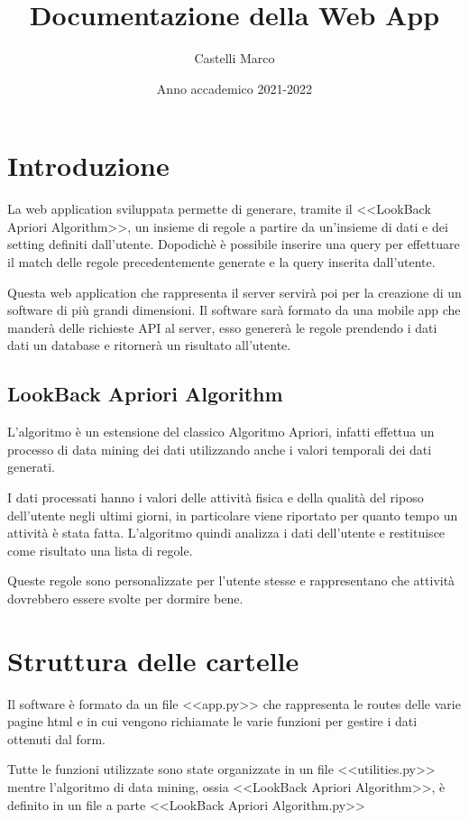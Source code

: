 \documentclass{article}
\title{Documentazione della Web App}
\author{Castelli Marco}
\date{Anno accademico 2021-2022}
\begin{document}
\maketitle
\newpage


\tableofcontents

\newpage

\section{Introduzione}

La web application sviluppata permette di generare, tramite il <<LookBack Apriori Algorithm>>, un insieme di regole a partire da un'insieme di dati e dei setting definiti dall'utente. Dopodichè è possibile inserire una query per effettuare il match delle regole precedentemente generate e la query inserita dall'utente.

Questa web application che rappresenta il server servirà poi per la creazione di un software di più grandi dimensioni. Il software sarà formato da una mobile app  che manderà delle richieste API al server, esso genererà le regole prendendo i dati dati un database e ritornerà un risultato all'utente.

\subsection{LookBack Apriori Algorithm}
L'algoritmo è un estensione del classico Algoritmo Apriori, infatti effettua un processo di data mining dei dati utilizzando anche i valori temporali dei dati generati.

 I dati processati hanno i valori delle attività fisica e della qualità del riposo dell'utente negli ultimi giorni, in particolare viene riportato per quanto tempo un attività è stata fatta. L'algoritmo quindi analizza i dati dell'utente e restituisce come risultato una lista di regole. 

Queste regole sono personalizzate per l'utente stesse e  rappresentano che attività dovrebbero essere svolte per dormire bene.

\section{Struttura delle cartelle}
Il software è formato da un file <<app.py>> che rappresenta le routes delle varie pagine html e in cui vengono richiamate le varie funzioni per gestire i dati ottenuti dal form.

Tutte le funzioni utilizzate sono state organizzate in un file <<utilities.py>> mentre l'algoritmo di data mining, ossia <<LookBack Apriori Algorithm>>, è definito in un file a parte <<LookBack Apriori Algorithm.py>>
\end{document}
